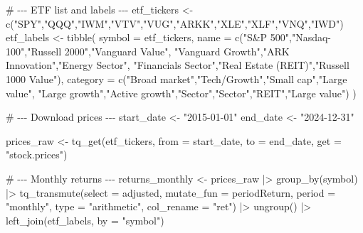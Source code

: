 \documentclass[
  letterpaper,
  DIV=11,
  numbers=noendperiod]{scrartcl}
\newenvironment{Shaded}{\begin{snugshade}}{\end{snugshade}}
\newcommand{\AttributeTok}[1]{\textcolor[rgb]{0.40,0.45,0.13}{#1}}
\newcommand{\CommentTok}[1]{\textcolor[rgb]{0.37,0.37,0.37}{#1}}
\newcommand{\FunctionTok}[1]{\textcolor[rgb]{0.28,0.35,0.67}{#1}}
\newcommand{\NormalTok}[1]{\textcolor[rgb]{0.00,0.23,0.31}{#1}}
\newcommand{\OtherTok}[1]{\textcolor[rgb]{0.00,0.23,0.31}{#1}}
\newcommand{\SpecialCharTok}[1]{\textcolor[rgb]{0.37,0.37,0.37}{#1}}
\newcommand{\StringTok}[1]{\textcolor[rgb]{0.13,0.47,0.30}{#1}}
\begin{document}
\begin{Shaded}
\begin{Highlighting}[]
\CommentTok{\# {-}{-}{-} ETF list and labels {-}{-}{-}}
\NormalTok{etf\_tickers }\OtherTok{\textless{}{-}} \FunctionTok{c}\NormalTok{(}\StringTok{"SPY"}\NormalTok{,}\StringTok{"QQQ"}\NormalTok{,}\StringTok{"IWM"}\NormalTok{,}\StringTok{"VTV"}\NormalTok{,}\StringTok{"VUG"}\NormalTok{,}\StringTok{"ARKK"}\NormalTok{,}\StringTok{"XLE"}\NormalTok{,}\StringTok{"XLF"}\NormalTok{,}\StringTok{"VNQ"}\NormalTok{,}\StringTok{"IWD"}\NormalTok{)}
\NormalTok{etf\_labels  }\OtherTok{\textless{}{-}} \FunctionTok{tibble}\NormalTok{(}
  \AttributeTok{symbol   =}\NormalTok{ etf\_tickers,}
  \AttributeTok{name     =} \FunctionTok{c}\NormalTok{(}\StringTok{"S\&P 500"}\NormalTok{,}\StringTok{"Nasdaq{-}100"}\NormalTok{,}\StringTok{"Russell 2000"}\NormalTok{,}\StringTok{"Vanguard Value"}\NormalTok{,}
               \StringTok{"Vanguard Growth"}\NormalTok{,}\StringTok{"ARK Innovation"}\NormalTok{,}\StringTok{"Energy Sector"}\NormalTok{,}
               \StringTok{"Financials Sector"}\NormalTok{,}\StringTok{"Real Estate (REIT)"}\NormalTok{,}\StringTok{"Russell 1000 Value"}\NormalTok{),}
  \AttributeTok{category =} \FunctionTok{c}\NormalTok{(}\StringTok{"Broad market"}\NormalTok{,}\StringTok{"Tech/Growth"}\NormalTok{,}\StringTok{"Small cap"}\NormalTok{,}\StringTok{"Large value"}\NormalTok{,}
               \StringTok{"Large growth"}\NormalTok{,}\StringTok{"Active growth"}\NormalTok{,}\StringTok{"Sector"}\NormalTok{,}\StringTok{"Sector"}\NormalTok{,}\StringTok{"REIT"}\NormalTok{,}\StringTok{"Large value"}\NormalTok{)}
\NormalTok{)}

\CommentTok{\# {-}{-}{-} Download prices {-}{-}{-}}
\NormalTok{start\_date }\OtherTok{\textless{}{-}} \StringTok{"2015{-}01{-}01"}
\NormalTok{end\_date   }\OtherTok{\textless{}{-}} \StringTok{"2024{-}12{-}31"}

\NormalTok{prices\_raw }\OtherTok{\textless{}{-}} \FunctionTok{tq\_get}\NormalTok{(etf\_tickers, }\AttributeTok{from =}\NormalTok{ start\_date, }\AttributeTok{to =}\NormalTok{ end\_date,}
                     \AttributeTok{get =} \StringTok{"stock.prices"}\NormalTok{)}

\CommentTok{\# {-}{-}{-} Monthly returns {-}{-}{-}}
\NormalTok{returns\_monthly }\OtherTok{\textless{}{-}}\NormalTok{ prices\_raw }\SpecialCharTok{|\textgreater{}}
  \FunctionTok{group\_by}\NormalTok{(symbol) }\SpecialCharTok{|\textgreater{}}
  \FunctionTok{tq\_transmute}\NormalTok{(}\AttributeTok{select =}\NormalTok{ adjusted, }\AttributeTok{mutate\_fun =}\NormalTok{ periodReturn,}
               \AttributeTok{period =} \StringTok{"monthly"}\NormalTok{, }\AttributeTok{type =} \StringTok{"arithmetic"}\NormalTok{,}
               \AttributeTok{col\_rename =} \StringTok{"ret"}\NormalTok{) }\SpecialCharTok{|\textgreater{}}
  \FunctionTok{ungroup}\NormalTok{() }\SpecialCharTok{|\textgreater{}}
  \FunctionTok{left\_join}\NormalTok{(etf\_labels, }\AttributeTok{by =} \StringTok{"symbol"}\NormalTok{)}


\end{Highlighting}
\end{Shaded}
\end{document}
